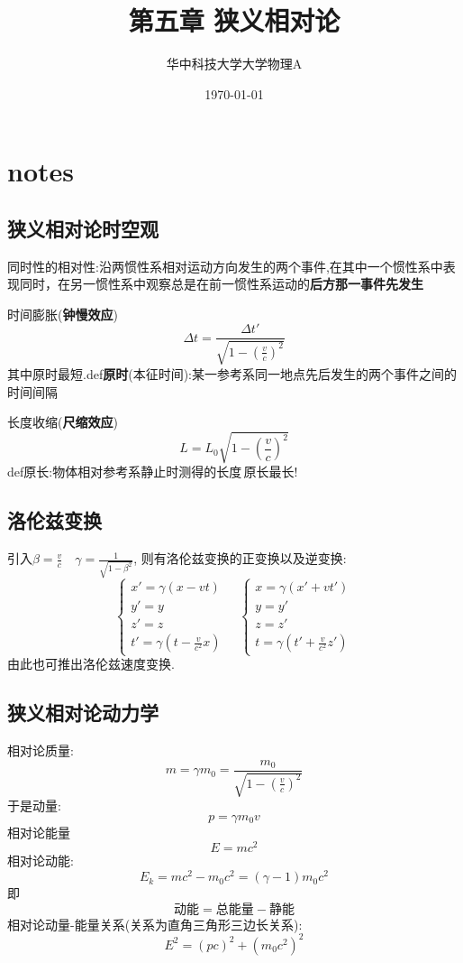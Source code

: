 \documentclass[10pt,a4paper]{article}
\title{第五章 狭义相对论}
\author{华中科技大学大学物理A}
\date{\today}
\begin{document}
\maketitle
\section{notes}
\subsection{狭义相对论时空观}
同时性的相对性:沿两惯性系相对运动方向发生的两个事件,在其中一个惯性系中表现同时，在另一惯性系中观察总是在前一惯性系运动的\textbf{后方那一事件先发生}

时间膨胀(\textbf{钟慢效应})
\[\Delta t=\frac{\Delta t'}{\sqrt{1-(\frac{v}{c})^2}}\]
其中原时最短.def\textbf{原时}(本征时间):某一参考系同一地点先后发生的两个事件之间的时间间隔

长度收缩(\textbf{尺缩效应})
\[L=L_0\sqrt{1-(\frac{v}{c})^2}\]
def原长:物体相对参考系静止时测得的长度\,原长最长!
\subsection{洛伦兹变换}
引入$\beta=\frac{v}{c}\quad\gamma=\frac{1}{\sqrt{1-\beta^2}}$,
则有洛伦兹变换的正变换以及逆变换:
\[
\begin{cases}
x'=\gamma(x-vt)\\
y'=y\\
z'=z\\
t'=\gamma(t-\frac{v}{c^2}x)
\end{cases}
\quad
\begin{cases}
x=\gamma(x'+vt')\\
y=y'\\
z=z'\\
t=\gamma(t'+\frac{v}{c^2}z')
\end{cases}
\]
由此也可推出洛伦兹速度变换.
\subsection{狭义相对论动力学}
相对论质量:
\[m=\gamma m_0=\frac{m_0}{\sqrt{1-(\frac{v}{c})^2}}\]
于是动量:
\[p=\gamma m_0v\]
相对论能量
\[E=mc^2\]
相对论动能:
\[E_k=mc^2-m_0c^2=(\gamma-1)m_0c^2\]
即
\[\text{动能}=\text{总能量}-\text{静能}\]
相对论动量-能量关系(关系为直角三角形三边长关系):
\[E^2=(pc)^2+(m_0c^2)^2\]
\end{document}
